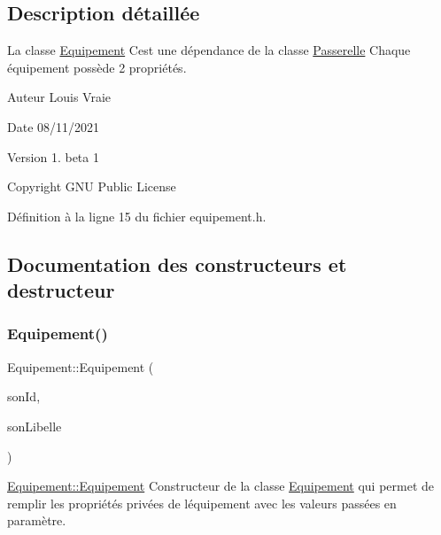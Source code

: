 \subsection{Description détaillée}
La classe \hyperlink{class_equipement}{Equipement} C\textquotesingle{}est une dépendance de la classe \hyperlink{class_passerelle}{Passerelle} Chaque équipement possède 2 propriétés. 

\begin{DoxyAuthor}{Auteur}
Louis Vraie 
\end{DoxyAuthor}
\begin{DoxyDate}{Date}
08/11/2021 
\end{DoxyDate}
\begin{DoxyVersion}{Version}
1. beta 1 
\end{DoxyVersion}
\begin{DoxyCopyright}{Copyright}
G\+NU Public License 
\end{DoxyCopyright}


Définition à la ligne 15 du fichier equipement.\+h.



\subsection{Documentation des constructeurs et destructeur}
\mbox{\label{class_equipement_a7017dfb537dadbaddac0d8006d96500b}} 
\subsubsection{\texorpdfstring{Equipement()}{Equipement()}\hspace{0.1cm}{\footnotesize\ttfamily [1/2]}}
{\footnotesize\ttfamily Equipement\+::\+Equipement (\begin{DoxyParamCaption}\item[{Q\+String}]{son\+Id,  }\item[{Q\+String}]{son\+Libelle }\end{DoxyParamCaption})}



\hyperlink{class_equipement_a7017dfb537dadbaddac0d8006d96500b}{Equipement\+::\+Equipement} Constructeur de la classe \hyperlink{class_equipement}{Equipement} qui permet de remplir les propriétés privées de l\textquotesingle{}équipement avec les valeurs passées en paramètre. 


